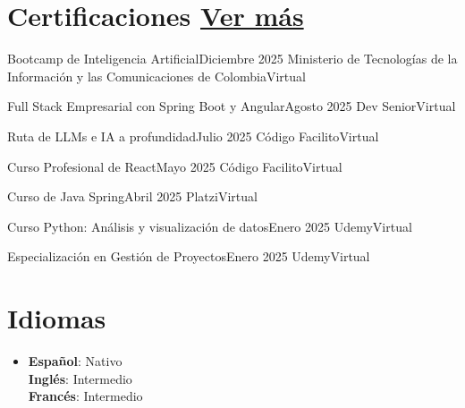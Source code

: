 \documentclass[letterpaper,12pt]{fed-res} %
\begin{document}
\section{Certificaciones \hfill \href{https://drive.google.com/file/d/12KfHzmgnhlbkWdalj6p2EXMJbWc-U870/view?usp=sharing}{Ver más}}
\resumeSubHeadingListStart
    \resumeSubheading
        {Bootcamp de Inteligencia Artificial}{Diciembre 2025}
        {Ministerio de Tecnologías de la Información y las Comunicaciones de Colombia}{Virtual}
            
    \resumeSubheading
        {Full Stack Empresarial con Spring Boot y Angular}{Agosto 2025}
        {Dev Senior}{Virtual}

    \resumeSubheading
        {Ruta de LLMs e IA a profundidad}{Julio 2025}
        {Código Facilito}{Virtual}

    \resumeSubheading
        {Curso Profesional de React}{Mayo 2025}
        {Código Facilito}{Virtual}

    \resumeSubheading
        {Curso de Java Spring}{Abril 2025}
        {Platzi}{Virtual}

    \resumeSubheading
        {Curso Python: Análisis y visualización de datos}{Enero 2025}
        {Udemy}{Virtual}

    \resumeSubheading
        {Especialización en Gestión de Proyectos}{Enero 2025}
        {Udemy}{Virtual}

\resumeSubHeadingListEnd


\section{Idiomas}
 \begin{itemize}[leftmargin=0.15in, label={}]
    \item{
        \textbf{Español}{: Nativo} \\
        \textbf{Inglés}{: Intermedio} \\
        \textbf{Francés}{: Intermedio}
    }
 \end{itemize}
\end{document}
